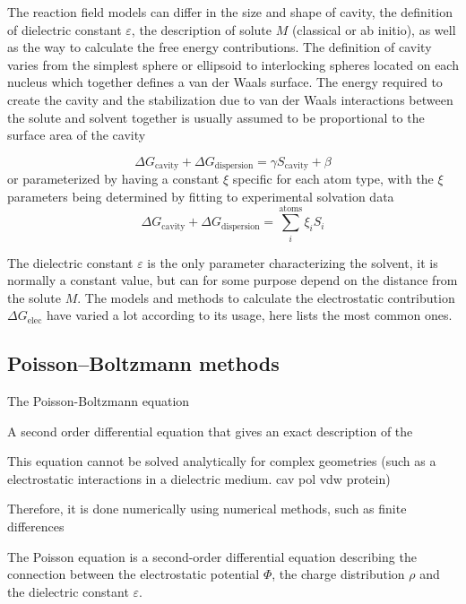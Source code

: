 The reaction field models can differ in the size and shape of cavity,
the definition of dielectric constant $\varepsilon$, the description
of solute $M$ (classical or ab initio), as well as the way to calculate
the free energy contributions. The definition of cavity varies from
the simplest sphere or ellipsoid to interlocking spheres located on
each nucleus which together defines a van der Waals surface. The energy
required to create the cavity and the stabilization due to van der
Waals interactions between the solute and solvent together is usually
assumed to be proportional to the surface area of the cavity

\begin{equation}
\Delta G_{\mathrm{cavity}}+\Delta G_{\mathrm{dispersion}}=\gamma S_{\mathrm{cavity}}+\beta
\end{equation}
or parameterized by having a constant $\xi$ specific for each atom
type, with the $\xi$ parameters being determined by fitting to experimental
solvation data
\begin{equation}
\Delta G_{\mathrm{cavity}}+\Delta G_{\mathrm{dispersion}}=\sum_{i}^{\mathrm{atoms}}\xi_{i}S_{i}
\end{equation}


The dielectric constant $\varepsilon$ is the only parameter characterizing
the solvent, it is normally a constant value, but can for some purpose
depend on the distance from the solute $M$. The models and methods
to calculate the electrostatic contribution $\Delta G_{\mathrm{elec}}$
have varied a lot according to its usage, here lists the most common
ones.


\subsection{Poisson–Boltzmann methods}

The Poisson-Boltzmann equation

A second order differential equation that gives an exact description
of the 

This equation cannot be solved analytically for complex geometries
(such as a electrostatic interactions in a dielectric medium. cav
pol vdw protein)

Therefore, it is done numerically using numerical methods, such as
finite differences

The Poisson equation is a second-order differential equation describing
the connection between the electrostatic potential $\Phi$, the charge
distribution $\rho$ and the dielectric constant $\varepsilon$.

